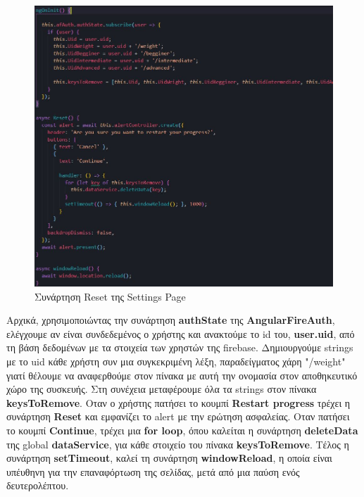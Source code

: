 \documentclass[a4paper,12pt]{article}
\begin{document}
		\begin{figure}[!htb]
			\begin{center}
				\caption{Συνάρτηση Reset της Settings Page}
				\vspace*{0.5cm}
				\includegraphics[width=.9\linewidth]{settings2} 
			\end{center}  	
		\end{figure}
		\vspace*{0.5cm}

		Αρχικά, χρησιμοποιώντας την συνάρτηση \textbf{authState} της \textbf{AngularFireAuth}, ελέγχουμε αν είναι συνδεδεμένος ο χρήστης και ανακτούμε το id του, 
		\textbf{user.uid}, από τη βάση δεδομένων με τα στοιχεία των χρηστών της firebase. Δημιουργούμε strings με το uid κάθε χρήστη συν μια συγκεκριμένη λέξη, παραδείγματος 
		χάρη "/weight" γιατί θέλουμε να αναφερθούμε στον πίνακα με αυτή την ονομασία στον αποθηκευτικό χώρο της συσκευής. Στη συνέχεια μεταφέρουμε όλα τα strings στον
		πίνακα \textbf{keysToRemove}. Οταν ο χρήστης πατήσει το κουμπί \textbf{Restart progress} τρέχει η συνάρτηση \textbf{Reset} και εμφανίζει το alert με την ερώτηση 
		ασφαλείας. Οταν πατήσει το κουμπί \textbf{Continue}, τρέχει μια \textbf{for loop}, όπου καλείται η συνάρτηση \textbf{deleteData} της global \textbf{dataService},
		για κάθε στοιχείο του πίνακα \textbf{keysToRemove}. Τέλος η συνάρτηση \textbf{setTimeout}, καλεί τη συνάρτηση \textbf{windowReload}, η οποία είναι υπέυθηνη για την 
		επαναφόρτωση της σελίδας, μετά από μια παύση ενός δευτερολέπτου.  
\end{document}
